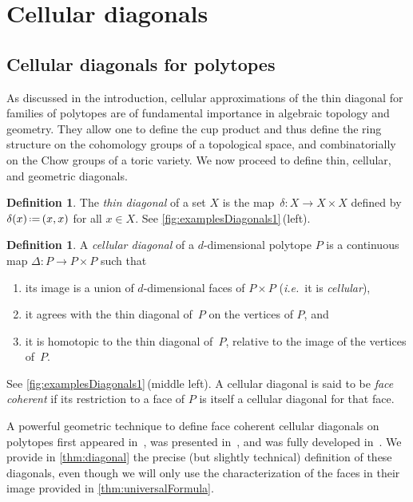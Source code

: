 \documentclass{amsart}
\newcommand{\darkblue}{\color{darkblue}} %
\theoremstyle{definition}
\newtheorem{definition}[theorem]{Definition}
\newcommand{\eqdef}{\mbox{\,\raisebox{0.2ex}{\scriptsize\ensuremath{\mathrm:}}\ensuremath{=}\,}} %
\newcommand{\ie}{\textit{i.e.}~} %
\newcommand{\defn}[1]{\textsl{\darkblue #1}} %
\begin{document}

\section{Cellular diagonals}
\label{sec:cellularDiagonals}


\subsection{Cellular diagonals for polytopes}
\label{subsec:cellularDiagonalsPolytopes}
 
As discussed in the introduction, cellular approximations of the thin diagonal for families of polytopes are of fundamental importance in algebraic topology and geometry.
They allow one to define the cup product and thus define the ring structure on the cohomology groups of a topological space, and combinatorially on the Chow groups of a toric variety. 
We now proceed to define thin, cellular, and geometric diagonals.

\begin{definition} 
\label{def:thinDiagonal}
The \defn{thin diagonal} of a set $X$ is the map~$\delta : X \to X \times X$ defined by $\delta(x) \eqdef (x,x)$ for all $x \in X$.
See \cref{fig:examplesDiagonals1}\,(left).
\end{definition}

\begin{definition} 
\label{def:cellularDiagonal}
A \defn{cellular diagonal} of a $d$-dimensional polytope $P$ is a continuous map ${\Delta : P \to P \times P}$ such that
\begin{enumerate}
\item its image is a union of $d$-dimensional faces of $P\times P$ (\ie it is \defn{cellular}),
\item it agrees with the thin diagonal of~$P$ on the vertices of $P$, and
\item it is homotopic to the thin diagonal of~$P$, relative to the image of the vertices of~$P$. 
\end{enumerate}
See \cref{fig:examplesDiagonals1}\,(middle left).
A cellular diagonal is said to be \defn{face coherent} if its restriction to a face of $P$ is itself a cellular diagonal for that face. 
\end{definition}

A powerful geometric technique to define face coherent cellular diagonals on polytopes first appeared in~\cite{FultonSturmfels}, was presented in~\cite{MasudaThomasTonksVallette}, and was fully developed in~\cite{LaplanteAnfossi}.
We provide in \cref{thm:diagonal} the precise (but slightly technical) definition of these diagonals, even though we will only use the characterization of the faces in their image provided in \cref{thm:universalFormula}.
\end{document}
